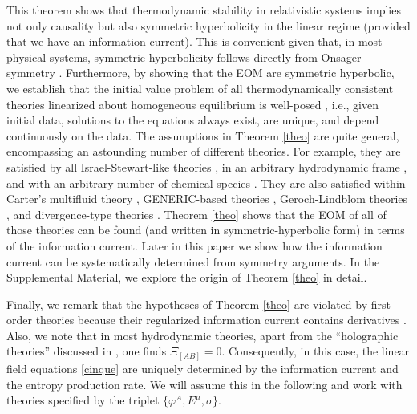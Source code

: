 \documentclass[aps,prl,singlecolumn,nofootinbib]{revtex4-2}
\theoremstyle{definition}
\theoremstyle{theorem}
\begin{document}
This theorem  
shows that thermodynamic stability in relativistic systems implies not only causality \cite{GavassinoCausality2021} but also symmetric hyperbolicity in the linear regime (provided that we have an information current). This is convenient given that, in most physical systems, symmetric-hyperbolicity follows directly from Onsager symmetry \cite{GavassinoCasmir2022}. Furthermore, by showing that the EOM are symmetric hyperbolic, we establish  that the initial value problem of all thermodynamically consistent theories 
linearized about homogeneous equilibrium
is well-posed   \cite{GerochPartial1996,Kato2009,CourantHilbert2_book}, i.e., given initial data, solutions to the equations always exist, are unique, and depend continuously on the data. 
The assumptions in Theorem \ref{theo} are quite general, encompassing an astounding number of different theories. For example, they are satisfied by all Israel-Stewart-like theories \cite{Israel_Stewart_1979,Hishcock1983,Baier2008,DMNR2012}, in an arbitrary hydrodynamic frame \cite{OlsonLifsh1990,BritoStability2020,
NoronhaGeneralFrame2021}, and with an arbitrary number of chemical species \cite{Almaalol2022}. They are also satisfied within Carter's multifluid theory \cite{carter1991,noto_rel,
GavassinoStabilityCarter2022}, GENERIC-based theories \cite{Otting2_1999,Otting3_1999,Stricker2019,
GavassinoGENERIC2022}, Geroch-Lindblom theories \cite{Geroch_Lindblom_1991_causal,LindblomRelaxation1996,
Geroch1995,GavassinoNonHydro2022}, and divergence-type theories \cite{Liu1986,GerochLindblom1990,
ZanniasDivergenceType2023}. Theorem \ref{theo} shows that the EOM of all of those theories can be found (and written in symmetric-hyperbolic form) in terms of the information current. Later in this paper we show how the information current can be systematically determined from symmetry arguments. In the Supplemental Material, we explore the origin of Theorem \ref{theo} in detail.    


Finally, we remark that the hypotheses of Theorem \ref{theo} are violated by first-order theories \cite{Bemfica2017TheFirst,
Bemfica2019_conformal1,Bemfica-Disconzi-Graber-2021,
BemficaDNDefinitivo2020,Kovtun2019,GavassinoLyapunov_2020,DoreGavassino2022} because their regularized information current contains derivatives \cite{GavassinoInfoBDNK2024ufs}. Also, we note that in most hydrodynamic theories, apart from the ``holographic theories'' discussed in \cite{Heller2014,GavassinoNonHydro2022}, one finds $\Xi_{[AB]}=0$. Consequently, in this case, the linear field equations \eqref{cinque} are uniquely determined by the information current and the entropy production rate. We will assume this in the following and work with theories specified by the triplet $\{\varphi^A,E^\mu,\sigma \}$. 
\end{document}
